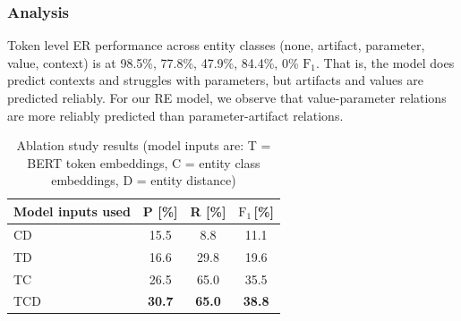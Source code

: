 


\subsubsection{Analysis}


Token level ER performance across entity classes (none, artifact, parameter, value, context) is at 98.5\%, 77.8\%, 47.9\%, 84.4\%, 0\% $\text{F}_1$. That is, the model does predict contexts and struggles with parameters, but artifacts and values are predicted reliably. For our RE model, we observe that value-parameter relations are more reliably predicted than parameter-artifact relations.




\begin{table}
  \centering
  \caption[Ablation study results]{Ablation study results (model inputs are: T = BERT token embeddings, C = entity class embeddings, D = entity distance)}
  \label{tab:finetunedablation}
  \begin{tabular}{lccc}
    \hline
    Model inputs used & P [\%] & R [\%] & $\text{F}_1$\,[\%] \\
    \hline
    \textvisiblespace CD & 15.5 & 8.8 & 11.1 \\
    T\textvisiblespace D & 16.6 & 29.8 & 19.6 \\
    TC\textvisiblespace & 26.5 & 65.0 & 35.5 \\
    TCD & \textbf{30.7} & \textbf{65.0} & \textbf{38.8} \\
    \hline
  \end{tabular}
\end{table}

